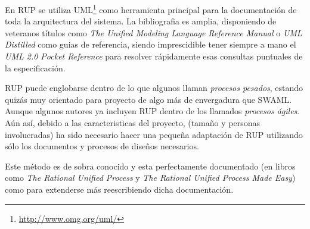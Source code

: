En RUP se utiliza UML\footnote{\url{http://www.omg.org/uml/}} como herramienta principal
para la documentación de toda la arquitectura del sistema. La bibliografia es amplia,
disponiendo de veteranos títulos como 
\emph{The Unified Modeling Language Reference Manual}\cite{UMLReference} o 
\emph{UML Distilled}\cite{UMLDistilled} como guias de referencia, siendo imprescidible
tener siempre a mano el \emph{UML 2.0 Pocket Reference}\cite{UMLPocket} para resolver
rápidamente esas consultas puntuales de la especificación.

RUP puede englobarse dentro de lo que algunos llaman \emph{procesos pesados},
estando quizás muy orientado para proyecto de algo más de envergadura que SWAML.
Aunque algunos autores\cite{Larman2004} ya incluyen RUP dentro de los llamados 
\emph{procesos ágiles}. Aún así, debido a las caracteristicas del proyecto, 
(tamaño y personas involucradas) ha sido necesario hacer una pequeña adaptación 
de RUP utilizando sólo los documentos y procesos de diseños necesarios.

Este método es de sobra conocido y esta perfectamente documentado (en libros como
\emph{The Rational Unified Process}\cite{RUPIntro} y
\emph{The Rational Unified Process Made Easy}\cite{RUPEasy}) como para
extenderse más reescribiendo dicha documentación.
